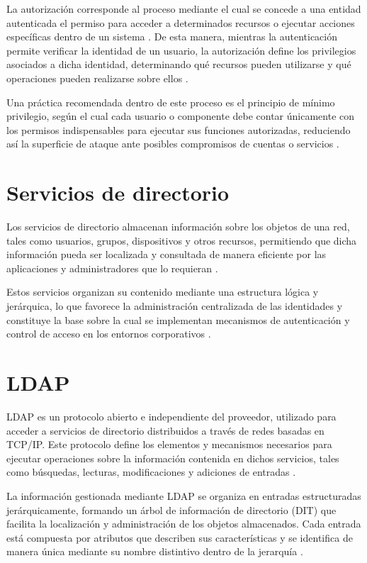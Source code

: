 La autorización corresponde al proceso mediante el cual se concede a una entidad autenticada el permiso para acceder a determinados recursos o ejecutar acciones específicas dentro de un sistema \citep{OWASP2026}. De esta manera, mientras la autenticación permite verificar la identidad de un usuario, la autorización define los privilegios asociados a dicha identidad, determinando qué recursos pueden utilizarse y qué operaciones pueden realizarse sobre ellos \citep{RFC4949}.

Una práctica recomendada dentro de este proceso es el principio de mínimo privilegio, según el cual cada usuario o componente debe contar únicamente con los permisos indispensables para ejecutar sus funciones autorizadas, reduciendo así la superficie de ataque ante posibles compromisos de cuentas o servicios \citep{OWASP2026}.

\section{Servicios de directorio}

Los servicios de directorio almacenan información sobre los objetos de una red, tales como usuarios, grupos, dispositivos y otros recursos, permitiendo que dicha información pueda ser localizada y consultada de manera eficiente por las aplicaciones y administradores que lo requieran \citep{Microsoft2025}.

Estos servicios organizan su contenido mediante una estructura lógica y jerárquica, lo que favorece la administración centralizada de las identidades y constituye la base sobre la cual se implementan mecanismos de autenticación y control de acceso en los entornos corporativos \citep{Microsoft2025}.

\section{\texorpdfstring{\acs{LDAP}}{LDAP}}

\ac{LDAP} es un protocolo abierto e independiente del proveedor, utilizado para acceder a servicios de directorio distribuidos a través de redes basadas en TCP/IP. Este protocolo define los elementos y mecanismos necesarios para ejecutar operaciones sobre la información contenida en dichos servicios, tales como búsquedas, lecturas, modificaciones y adiciones de entradas \citep{RFC4511}.

La información gestionada mediante \acs{LDAP} se organiza en entradas estructuradas jerárquicamente, formando un árbol de información de directorio (\acs{DIT}) que facilita la localización y administración de los objetos almacenados. Cada entrada está compuesta por atributos que describen sus características y se identifica de manera única mediante su nombre distintivo dentro de la jerarquía \citep{RFC4512}.

